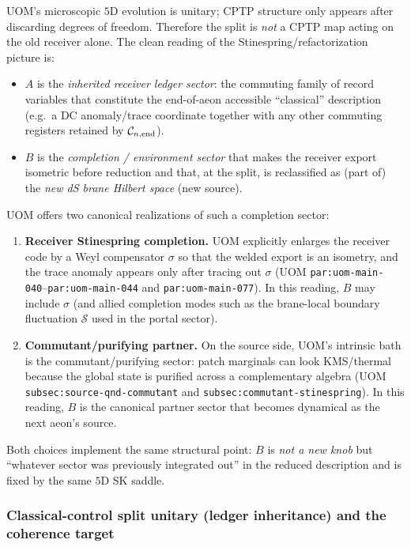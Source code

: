 \documentclass[11pt]{article}
\theoremstyle{definition}
\theoremstyle{plain}
\theoremstyle{remark}
\newcommand{\cC}{\mathcal C}
\begin{document}
UOM's microscopic $5$D evolution is unitary; CPTP structure only appears after discarding degrees of freedom.
Therefore the split is \emph{not} a CPTP map acting on the old receiver alone.
The clean reading of the Stinespring/refactorization picture is:
\begin{itemize}[leftmargin=1.6em]
\item $A$ is the \emph{inherited receiver ledger sector}: the commuting family of record variables that constitute the
end-of-aeon accessible ``classical'' description (e.g.\ a DC anomaly/trace coordinate together with any other commuting
registers retained by $\cC_{n,{\rm end}}$).
\item $B$ is the \emph{completion / environment sector} that makes the receiver export isometric before reduction and that,
at the split, is reclassified as (part of) the \emph{new dS brane Hilbert space} (new source).
\end{itemize}
UOM offers two canonical realizations of such a completion sector:
\begin{enumerate}[leftmargin=2em]
\item \textbf{Receiver Stinespring completion.}
UOM explicitly enlarges the receiver code by a Weyl compensator $\sigma$ so that the welded export is an isometry, and
the trace anomaly appears only after tracing out $\sigma$ (UOM \texttt{par:uom-main-040}--\texttt{par:uom-main-044} and
\texttt{par:uom-main-077}).
In this reading, $B$ may include $\sigma$ (and allied completion modes such as the brane-local boundary fluctuation
$\mathcal S$ used in the portal sector).
\item \textbf{Commutant/purifying partner.}
On the source side, UOM's intrinsic bath is the commutant/purifying sector: patch marginals can look KMS/thermal because
the global state is purified across a complementary algebra (UOM \texttt{subsec:source-qnd-commutant} and
\texttt{subsec:commutant-stinespring}).
In this reading, $B$ is the canonical partner sector that becomes dynamical as the next aeon's source.
\end{enumerate}
Both choices implement the same structural point: $B$ is \emph{not a new knob} but ``whatever sector was previously
integrated out'' in the reduced description and is fixed by the same $5$D SK saddle.

\subsubsection*{Classical-control split unitary (ledger inheritance) and the coherence target}
\label{subsec:classical-control-split}
\end{document}
